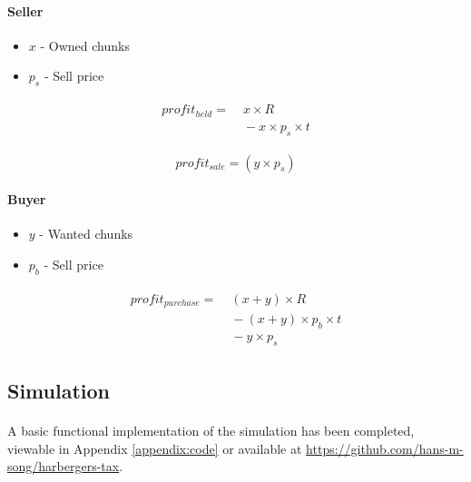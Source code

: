 
\paragraph{Seller}

\begin{itemize}
  \item $x$ - Owned chunks
  \item $p_s$ - Sell price
\end{itemize}

\begin{align}
  \begin{split}
    profit_{held} = &\; x \times R \\
    &\; - x \times p_s \times t
  \end{split}
\end{align}

\begin{equation}
  profit_{sale} = (y \times p_s)
\end{equation}

\paragraph{Buyer}

\begin{itemize}
  \item $y$ - Wanted chunks
  \item $p_b$ - Sell price
\end{itemize}

\begin{align}
  \begin{split}
    profit_{purchase} = &\; (x + y) \times R \\
    &\; - (x + y) \times p_b \times t \\
    &\; - y \times p_s
  \end{split}
\end{align}

\subsection{Simulation}

\paragraph{} A basic functional implementation of the simulation has been completed, viewable in Appendix \ref{appendix:code}  or available at \url{https://github.com/hans-m-song/harbergers-tax}. 

